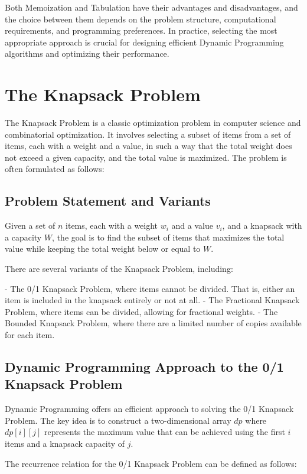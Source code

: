 \documentclass[12pt]{book} %
\begin{document}
Both Memoization and Tabulation have their advantages and disadvantages, and the choice between them depends on the problem structure, computational requirements, and programming preferences. In practice, selecting the most appropriate approach is crucial for designing efficient Dynamic Programming algorithms and optimizing their performance.

\section{The Knapsack Problem}

The Knapsack Problem is a classic optimization problem in computer science and combinatorial optimization. It involves selecting a subset of items from a set of items, each with a weight and a value, in such a way that the total weight does not exceed a given capacity, and the total value is maximized. The problem is often formulated as follows:

\subsection{Problem Statement and Variants}

Given a set of \(n\) items, each with a weight \(w_i\) and a value \(v_i\), and a knapsack with a capacity \(W\), the goal is to find the subset of items that maximizes the total value while keeping the total weight below or equal to \(W\).

There are several variants of the Knapsack Problem, including:

- The 0/1 Knapsack Problem, where items cannot be divided. That is, either an item is included in the knapsack entirely or not at all.
- The Fractional Knapsack Problem, where items can be divided, allowing for fractional weights.
- The Bounded Knapsack Problem, where there are a limited number of copies available for each item.

\subsection{Dynamic Programming Approach to the 0/1 Knapsack Problem}

Dynamic Programming offers an efficient approach to solving the 0/1 Knapsack Problem. The key idea is to construct a two-dimensional array \(dp\) where \(dp[i][j]\) represents the maximum value that can be achieved using the first \(i\) items and a knapsack capacity of \(j\).

The recurrence relation for the 0/1 Knapsack Problem can be defined as follows:
\end{document}
